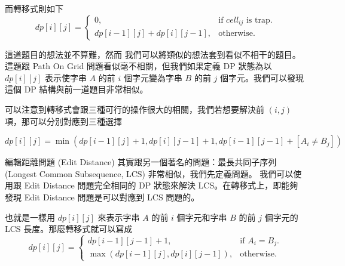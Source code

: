 \documentclass[main.tex]{subfiles}
\begin{document}
        而轉移式則如下
        $$dp[i][j] = \begin{cases}
            0, & \text{if $cell_{ij}$ is trap}. \\
            dp[i-1][j] + dp[i][j-1], & \text{otherwise}.
        \end{cases}$$
        
        這道題目的想法並不算難，然而
        我們可以將類似的想法套到看似不相干的題目。
        這題跟 Path On Grid 問題看似毫不相關，但我們如果定義 DP 狀態為以 $dp[i][j]$ 表示使字串 $A$ 的前 $i$ 個字元變為字串 $B$ 的前 $j$ 個字元。我們可以發現這個 DP 結構與前一道題目非常相似。
        
        可以注意到轉移式會跟三種可行的操作很大的相關，我們若想要解決前 $(i, j)$ 項，那可以分別對應到三種選擇
        
        $$dp[i][j] = \min(dp[i-1][j] + 1, dp[i][j-1] + 1, dp[i-1][j-1] + [A_i \neq B_j])$$
        
        編輯距離問題 (Edit Distance) 其實跟另一個著名的問題：最長共同子序列 (Longest Common Subsequence, LCS) 非常相似，我們先定義問題。
        我們可以使用跟 Edit Distance 問題完全相同的 DP 狀態來解決 LCS。在轉移式上，即能夠發現 Edit Distance 問題是可以對應到 LCS 問題的。
        
        也就是一樣用 $dp[i][j]$ 來表示字串 $A$ 的前 $i$ 個字元和字串 $B$ 的前 $j$ 個字元的 LCS 長度。那麼轉移式就可以寫成
        $$dp[i][j] = \begin{cases}
            dp[i-1][j-1] + 1, & \text{if $A_i = B_j$}.\\
            \max(dp[i-1][j], dp[i][j-1]), & \text{otherwise}.
        \end{cases}$$
        
\end{document}
